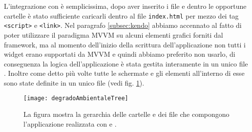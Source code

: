 			L'integrazione con \kendomob{} è semplicissima, dopo aver inserito 
			i file \js{} e \css{} dentro le opportune cartelle è stato sufficiente 
			caricarli dentro al file \texttt{index.html} per mezzo dei tag 
			\texttt{<script>} e \texttt{<link>}.
			Nel paragrafo \ref{subsec:kendo} abbiamo accennato al fatto di poter 
			utilizzare il paradigma MVVM su alcuni elementi grafici forniti dal 
			framework, ma al momento dell'inizio della scrittura dell'applicazione 
			non tutti i widget erano supportati da MVVM e quindi abbiamo preferito 
			non usarlo, di conseguenza la logica dell'applicazione è stata gestita 
			interamente in un unico file \js{}. Inoltre come detto più volte 
			tutte le schermate e gli elementi all'interno di esse sono state 
			definite in un unico file \html{} (vedi fig. \ref{fig:degradoAmbientaleTree}).
			\begin{figure}[h]
				\centering
				\texttt{[image: degradoAmbientaleTree]}
				\caption{
				La figura mostra la gerarchia delle cartelle e dei file che 
				compongono l'applicazione realizzata con \pg{} e \kendomob{}.
				}
				\label{fig:degradoAmbientaleTree}
			\end{figure}
			

